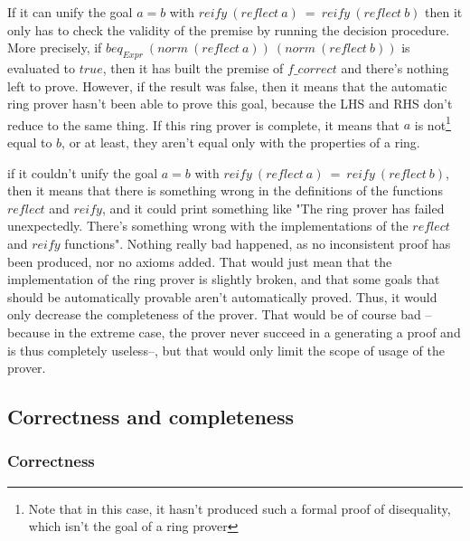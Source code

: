 \itemize
\item
If it can unify the goal $a=b$ with $reify\ (reflect\ a)\ =\ reify\ (reflect\ b)$ then it only has to check the validity of the premise by running the decision procedure. More precisely, if $beq_{Expr}\ (norm\ (reflect\ a))\ (norm\ (reflect\ b))$ is evaluated to $true$, then it has built the premise of $f\_correct$ and there's nothing left to prove. However, if the result was false, then it means that the automatic ring prover hasn't been able to prove this goal, because the LHS and RHS don't reduce to the same thing. If this ring prover is complete, it means that $a$ is not\footnote{Note that in this case, it hasn't produced such a formal proof of disequality, which isn't the goal of a ring prover} equal to $b$, or at least, they aren't equal only with the properties of a ring.
\item
if it couldn't unify the goal $a=b$ with $reify\ (reflect\ a)\ =\ reify\ (reflect\ b)$, then it means that there is something wrong in the definitions of the functions $reflect$ and $reify$, and it could print something like "The ring prover has failed unexpectedly. There's something wrong with the implementations of the $reflect$ and $reify$ functions". Nothing really bad happened, as no inconsistent proof has been produced, nor no axioms added. That would just mean that the implementation of the ring prover is slightly broken, and that some goals that should be automatically provable aren't automatically proved. Thus, it would only decrease the completeness of the prover. That would be of course bad --because in the extreme case, the prover never succeed in a generating a proof and is thus completely useless--, but that would only limit the scope of usage of the prover.

	\subsection {Correctness and completeness}

		\subsubsection{Correctness}
		
